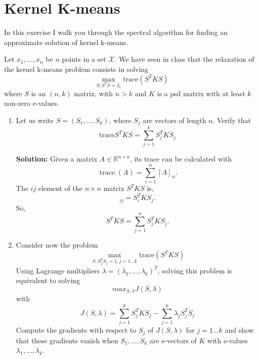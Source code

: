 \documentclass{article}[12pt]
\begin{document}
 \section{Kernel K-means}
 
 In this exercise I walk you through the spectral algorithm for finding an approximate solution of kernel k-means. 
 
 Let $x_1,\ldots,x_n$ be $n$ points in a set $\mathcal{X}$. We have seen in class that the relaxation of the kernel k-means problem consists in solving 
 \begin{equation}
 \label{eq:kmeans}
 \max_{S,S^T S=I_k} \mbox{trace}\left(S^T K S\right)
 \end{equation}
 where $S$ is an $(n,k)$ matrix, with $n>k$ and $K$ is a psd matrix with at least $k$ non-zero e-values. 
 \begin{enumerate}
 \item Let us write $S=(S_1,\ldots,S_k)$, where $S_j$ are vectors of length $n$. 
 Verify that 
 \begin{equation}
 \mbox{trace}S^TKS = \sum_{j=1}^k S_j^T K S_j
 \end{equation}

 \textbf{Solution:} Given a matrix $A \in \mathbb R^{n \times n}$, its trace can be calculated with
 \begin{equation}
	 \operatorname{trace}(A) = \sum^{n}_{i=1} [A]_{ii}. 
 \end{equation}
 The $ij$ element of the $n\times n$ matrix $S^T KS$ is,
 \begin{equation}
	 [S^T K S]_{ij} = S_i^T K S_j.
 \end{equation}
 So,
 \begin{equation}
	 {S^T K S}= \sum^{n}_{j=1} S_j^T K S_j. 
 \end{equation}

\item  Consider now the problem 
 \begin{equation}
 \label{eq:2}
 \max_{S,S_j^TS_j=1,j=1\ldots k} \mbox{trace}\left(S^TKS\right)
 \end{equation}
 Using Lagrange multipliers $\lambda=(\lambda_1,\ldots,\lambda_k)^T$, solving this problem is equivalent to solving 
 \begin{equation}
 max_{S,\lambda} J(S,\lambda) 
 \end{equation}
 with 
 \begin{equation}
 J(S,\lambda) =  \sum_{j=1}^k S_j^T K S_j - \sum_{j=1}^k \lambda_j S_j^TS_j
 \end{equation}
  Compute the gradients with respect to $S_j$ of $J(S,\lambda)$ for $j=1\ldots k$ and show that these gradients vanish when $S_1,\ldots,S_k$ are e-vectors of $K$ with e-values $\lambda_1,\ldots,\lambda_k$. 


\end{enumerate}
\end{document}
